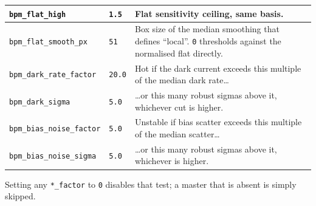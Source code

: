 \documentclass[11pt,a4paper]{article}
\begin{document}
\begin{center}
\begin{longtable}{|p{4.6cm}|p{1.9cm}|p{8.0cm}|}
\hline
\texttt{bpm\_flat\_high} & \texttt{1.5} & Flat sensitivity ceiling, same basis. \\
\hline
\texttt{bpm\_flat\_smooth\_px} & \texttt{51} & Box size of the median smoothing that defines ``local''. \texttt{0} thresholds against the normalised flat directly. \\
\hline
\texttt{bpm\_dark\_rate\_factor} & \texttt{20.0} & Hot if the dark current exceeds this multiple of the median dark rate\ldots \\
\hline
\texttt{bpm\_dark\_sigma} & \texttt{5.0} & \ldots or this many robust sigmas above it, whichever cut is higher. \\
\hline
\texttt{bpm\_bias\_noise\_factor} & \texttt{5.0} & Unstable if bias scatter exceeds this multiple of the median scatter\ldots \\
\hline
\texttt{bpm\_bias\_noise\_sigma} & \texttt{5.0} & \ldots or this many robust sigmas above it, whichever is higher. \\
\hline
\end{longtable}
\end{center}

Setting any \texttt{*\_factor} to \texttt{0} disables that test; a master that is
absent is simply skipped.
\end{document}
